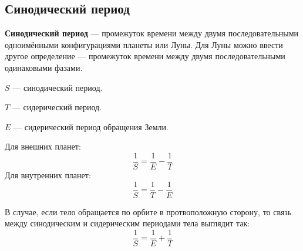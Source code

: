 \subsection{Синодический период}

\textbf{Синодический период} --- промежуток времени между двумя последовательными одноимёнными конфигурациями планеты или Луны. Для Луны можно ввести другое определение --- промежуток времени между двумя последовательными одинаковыми фазами.

$S$ --- синодический период.

$T$ --- сидерический период.

$E$ --- сидерический период обращения Земли.

Для внешних планет:
$$\frac1S=\frac1E-\frac1T$$
Для внутренних планет:
$$\frac1S=\frac1T-\frac1E$$

В случае, если тело обращается по орбите в протвоположную сторону, то связь между синодическим и сидерическим периодами тела выглядит так:
$$\frac1S=\frac1E+\frac1T$$